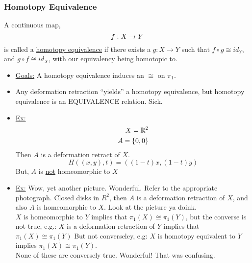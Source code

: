 \documentclass[../notes.tex]{subfiles}
\begin{document}
\subsubsection{Homotopy Equivalence}
\begin{definition}
    A continuous map,
    \[
        f: X\rightarrow Y\\
    \]
    is called a \underline{homotopy equivalence} if there exists a $g:X\rightarrow Y$ such
    that $f\circ g\cong id_Y$, and $g\circ f \cong id_X$, with our equivalency being
    homotopic to.
\end{definition}
\begin{itemize}
    \item \underline{Goals:} A homotopy equivalence induces an $\cong$ on $\pi_1$.
    \item Any deformation retraction ``yields'' a homotopy equivalence, but homotopy
        equivalence is an EQUIVALENCE relation. Sick.
    \item \underline{Ex:}
        \begin{align*}
            X=\mathbb{R}^2\\
            A=\{0,0\}\\
        \end{align*}
        Then $A$ is a deformation retract of $X$.
        \[
            H((x,y),t)=((1-t)x,(1-t)y)
        \]
        But, $A$ is \underline{not} homeomorphic to $X$
    \item \underline{Ex:}
        Wow, yet another picture. Wonderful. Refer to the appropriate photograph.
        Closed disks in $R^2$, then $A$ is a deformation retraction of $X$, and also
        $A$ is homeomorphic to $X$. Look at the picture ya doink.\\
        $X$ is homeomorphic to $Y$ implies that $\pi_1(X)\cong\pi_1(Y)$, but the
        converse is not true, e.g.:
        $X$ is a deformation retraction of $Y$ implies that $\pi_1(X)\cong \pi_1(Y)$
        But not converseley, e.g:
        $X$ is homotopy equivalent to $Y$ implies $\pi_1(X)\cong \pi_1(Y)$.\\
        None of these are conversely true. Wonderful! That was confusing.
\end{itemize}
\end{document}
